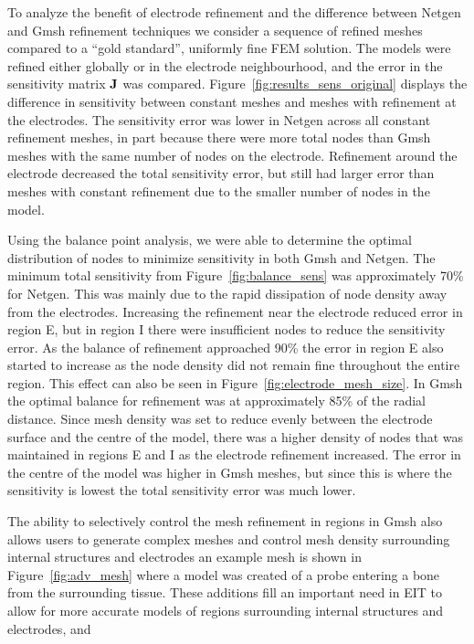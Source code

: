 \documentclass[12pt]{iopart}
\begin{document}
To analyze the benefit of electrode refinement and the difference between 
Netgen and Gmsh refinement techniques we consider
a sequence of refined meshes compared to a ``gold standard'', uniformly fine
FEM solution. The models were refined either globally or in the electrode
neighbourhood, and the error in the sensitivity matrix $\bf J$ %
was compared. Figure~\ref{fig:results_sens_original} displays the difference 
in sensitivity between constant meshes and meshes with refinement at the electrodes. 
The sensitivity error was lower in Netgen across all constant refinement meshes, in
part because there were more total nodes than Gmsh meshes with the same number
of nodes on the electrode. Refinement around the electrode decreased the total 
sensitivity error, but still had larger error than meshes with constant refinement 
due to the smaller number of nodes in the model. 

Using the balance point analysis, we were able to determine the optimal distribution
of nodes to minimize sensitivity in both Gmsh and Netgen. The minimum total sensitivity 
from Figure~\ref{fig:balance_sens} was approximately 70\% for Netgen. This was mainly 
due to the rapid dissipation of node density away from the electrodes. Increasing 
the refinement near the electrode reduced
error in region E, but in region I there were insufficient
nodes to reduce the sensitivity error. As the balance of refinement approached
90\% the error in region E also started to increase as the node density did not remain
fine throughout the entire region. This effect can also be seen in 
Figure~\ref{fig:electrode_mesh_size}.
In Gmsh the optimal balance for refinement was at approximately 85\%
of the radial distance. Since mesh density was set to reduce evenly 
between the electrode surface and the centre of the model, there 
was a higher density of nodes that was maintained in regions E and I as the 
electrode refinement increased. The error in the centre of the model 
was higher in Gmsh meshes, but since this is where the sensitivity is 
lowest the total sensitivity error was much lower. 

The ability to selectively control the mesh refinement in regions in Gmsh also allows 
users to generate complex meshes and control mesh density surrounding internal structures 
and electrodes an example mesh is shown in Figure~\ref{fig:adv_mesh} where a model was
created of
a probe entering a bone from the surrounding tissue. 
These additions fill an important need in EIT to allow for more accurate models 
of regions surrounding internal structures and electrodes, and 
\end{document}
